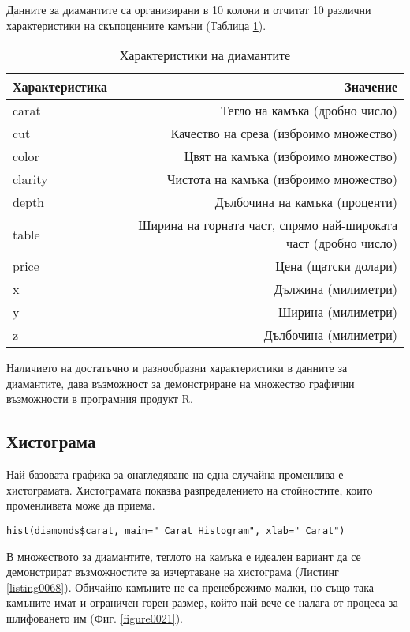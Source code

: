 Данните за диамантите са организирани в 10 колони и отчитат 10 различни характеристики на скъпоценните камъни (Таблица \ref{table0002}).

\begin{table}[h!]
\centering
\begin{tabular}{|l|r|} 
  \rowcolor{lightgray}
  \hline
  Характеристика & Значение \\ [0.1ex] 
  \hline\hline
  carat & Тегло на камъка (дробно число) \\
  \hline
  cut & Качество на среза (изброимо множество) \\
  \hline
  color & Цвят на камъка (изброимо множество) \\
  \hline
  clarity & Чистота на камъка (изброимо множество) \\
  \hline
  depth & Дълбочина на камъка (проценти) \\
  \hline
  table & Ширина на горната част, спрямо най-широката част (дробно число) \\
  \hline
  price & Цена (щатски долари) \\
  \hline
  x & Дължина (милиметри) \\
  \hline
  y & Ширина (милиметри) \\
  \hline
  z & Дълбочина (милиметри) \\
  \hline
\end{tabular}
\caption{Характеристики на диамантите}
\label{table0002}
\end{table}

Наличието на достатъчно и разнообразни характеристики в данните за диамантите, дава възможност за демонстриране на множество графични възможности в програмния продукт R.

\subsection{Хистограма}

Най-базовата графика за онагледяване на една случайна променлива е хистограмата. Хистограмата показва разпределението на стойностите, които променливата може да приема.

\begin{lstlisting}[caption=Генериране на хистограма за теглото на камъните, label=listing0068]
hist(diamonds$carat, main=" Carat Histogram", xlab=" Carat")
\end{lstlisting}

В множеството за диамантите, теглото на камъка е идеален вариант да се демонстрират възможностите за изчертаване на хистограма (Листинг \ref{listing0068}). Обичайно камъните не са пренебрежимо малки, но също така камъните имат и ограничен горен размер, който най-вече се налага от процеса за шлифоването им (Фиг. \ref{figure0021}).

